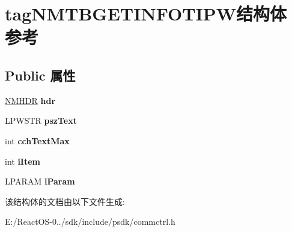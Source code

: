 \hypertarget{structtag_n_m_t_b_g_e_t_i_n_f_o_t_i_p_w}{}\section{tag\+N\+M\+T\+B\+G\+E\+T\+I\+N\+F\+O\+T\+I\+P\+W结构体 参考}
\label{structtag_n_m_t_b_g_e_t_i_n_f_o_t_i_p_w}
\subsection*{Public 属性}
\begin{DoxyCompactItemize}
\item 
\mbox{\label{structtag_n_m_t_b_g_e_t_i_n_f_o_t_i_p_w_ab8d68d7ffa5c9dcc1adbf6174670fd6d}} 
\hyperlink{structtag_n_m_h_d_r}{N\+M\+H\+DR} {\bfseries hdr}
\item 
\mbox{\label{structtag_n_m_t_b_g_e_t_i_n_f_o_t_i_p_w_a5603619e3eceff37951299e163bc513f}} 
L\+P\+W\+S\+TR {\bfseries psz\+Text}
\item 
\mbox{\label{structtag_n_m_t_b_g_e_t_i_n_f_o_t_i_p_w_aa9c216b8f39f0de938474ae00e0b0646}} 
int {\bfseries cch\+Text\+Max}
\item 
\mbox{\label{structtag_n_m_t_b_g_e_t_i_n_f_o_t_i_p_w_a316d2275e55b2f91ddf49c9af8a4f22e}} 
int {\bfseries i\+Item}
\item 
\mbox{\label{structtag_n_m_t_b_g_e_t_i_n_f_o_t_i_p_w_a9d9c99c0b53bfecdcaaec346a2ac3937}} 
L\+P\+A\+R\+AM {\bfseries l\+Param}
\end{DoxyCompactItemize}


该结构体的文档由以下文件生成\+:\begin{DoxyCompactItemize}
\item 
E\+:/\+React\+O\+S-\/0../sdk/include/psdk/commctrl.\+h\end{DoxyCompactItemize}
